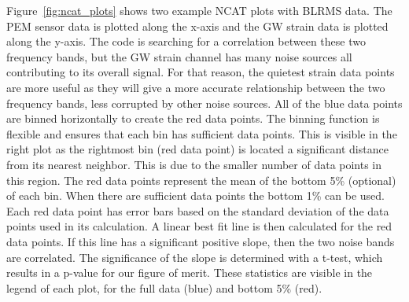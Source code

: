 Figure~\ref{fig:ncat_plots} shows two example NCAT plots with BLRMS data. The PEM sensor data is plotted along the x-axis and the GW strain data is plotted along the y-axis. The code is searching for a correlation between these two frequency bands, but the GW strain channel has many noise sources all contributing to its overall signal. For that reason, the quietest strain data points are more useful as they will give a more accurate relationship between the two frequency bands, less corrupted by other noise sources. All of the blue data points are binned horizontally to create the red data points. The binning function is flexible and ensures that each bin has sufficient data points. This is visible in the right plot as the rightmost bin (red data point) is located a significant distance from its nearest neighbor. This is due to the smaller number of data points in this region. The red data points represent the mean of the bottom 5\% (optional) of each bin. When there are sufficient data points the bottom 1\% can be used. Each red data point has error bars based on the standard deviation of the data points used in its calculation. A linear best fit line is then calculated for the red data points. If this line has a significant positive slope, then the two noise bands are correlated. The significance of the slope is determined with a t-test, which results in a p-value for our figure of merit. These statistics are visible in the legend of each plot, for the full data (blue) and bottom 5\% (red).

